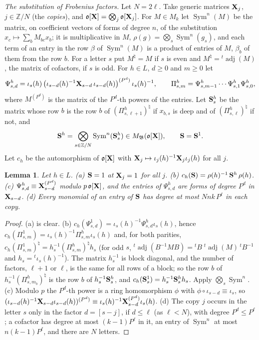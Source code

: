 \documentclass[10pt]{amsart}
\newtheorem{lemma}[theorem]{Lemma}
\theoremstyle{definition}
\theoremstyle{remark}
\newcommand{\Z}{\mathbb Z}
\providecommand{\pao}{\mathfrak o}
\providecommand{\phB}{\mathfrak B}
\begin{document}
\emph{The substitution of Frobenius factors.} Let $N=2\ell$. Take generic matrices $\mathbf X_j$,
$j\in\Z/N$ (the \emph{copies}), and $\pao[\peX]=\bigotimes_j\pao[\peX_j]$. For $M\in M_k$ let
$\operatorname{Sym}^n(M)$ be the matrix, on coefficient vectors of forms of degree $n$, of the
substitution $x_c\mapsto\sum_bM_{bc}x_b$; it is multiplicative in $M$, $\rho(g)=\bigotimes_s
\operatorname{Sym}^n(g_s)$, and each term of an entry in the row $\beta$ of
$\operatorname{Sym}^n(M)$ is a product of entries of $M$, $\beta_b$ of them from the row $b$. For a
letter $s$ put $M^\natural=M$ if $s$ is even and $M^\natural={}^t\!\operatorname{adj}(M)$, the
matrix of cofactors, if $s$ is odd. For $h\in L$, $d\ge0$ and $m\ge0$ let
\[
\Psi^h_{s,d}=\iota_s(h)\,\bigl(\iota_{s-d}(h)^{-1}\mathbf X_{s-d}\,\iota_{s-d}(h)\bigr)^{(P^d)}\,\iota_s
(h)^{-1},\qquad\Pi^h_{s,m}=\Psi^h_{s,m-1}\cdots\Psi^h_{s,1}\Psi^h_{s,0},
\]
where $M^{(P^d)}$ is the matrix of the $P^d$-th powers of the entries. Let $\mathbf S^h_s$ be the matrix
whose row $b$ is the row $b$ of $(\Pi^h_{s,\ell+1})^\natural$ if $x_{b,s}$ is deep and of
$(\Pi^h_{s,\ell})^\natural$ if not, and
\[
\peS^h=\bigotimes_{s\in\Z/N}\operatorname{Sym}^n(\peS^h_s)\in M_\phB(\pao[\peX]),\qquad\peS=\peS^1.
\]
Let $c_h$ be the automorphism of $\pao[\peX]$ with $\mathbf X_j\mapsto\iota_j(h)^{-1}\mathbf X_j\iota_j(h)$
for all $j$.

\begin{lemma}\label{pe:subst}
Let $h\in L$. {\rm(a)} $\mathbf S=1$ at $\mathbf X_j=1$ for all $j$. {\rm(b)} $c_h(\mathbf S)=\rho(h)^{-1}\,
\mathbf S^h\,\rho(h)$. {\rm(c)} $\Psi^h_{s,d}\equiv\mathbf X_{s-d}^{(P^d)}$ modulo $p\,\pao[\peX]$, and the
entries of $\Psi^h_{s,d}$ are forms of degree $P^d$ in $\mathbf X_{s-d}$. {\rm(d)} Every monomial of an
entry of $\mathbf S$ has degree at most $Nnk\,P^\ell$ in each copy.
\end{lemma}
\begin{proof}
(a) is clear. (b) $c_h(\Psi^1_{s,d})=\iota_s(h)^{-1}\Psi^h_{s,d}\iota_s(h)$, hence
$c_h(\Pi^1_{s,m})=\iota_s(h)^{-1}\Pi^h_{s,m}\iota_s(h)$ and, for both parities,
$c_h(\Pi^1_{s,m})^\natural=h_s^{-1}(\Pi^h_{s,m})^\natural h_s$ (for odd $s$,
${}^t\!\operatorname{adj}(B^{-1}MB)={}^tB\;{}^t\!\operatorname{adj}(M)\,{}^tB^{-1}$ and
$h_s={}^t\iota_s(h)^{-1}$). The matrix $h_s^{-1}$ is block diagonal, and the number of factors,
$\ell+1$ or $\ell$, is the same for all rows of a block; so the row $b$ of $h_s^{-1}(\Pi^h_{s,m_b}
)^\natural$ is the row $b$ of $h_s^{-1}\mathbf S^h_s$, and $c_h(\mathbf S^1_s)=h_s^{-1}\mathbf S^h_sh_s$. Apply
$\bigotimes_s\operatorname{Sym}^n$. (c) Modulo $p$ the $P^d$-th power is a ring homomorphism
$\phi$ with $\phi\circ\iota_{s-d}\equiv\iota_s$, so $(\iota_{s-d}(h)^{-1}\mathbf X_{s-d}\iota_{s-d}(h)
)^{(P^d)}\equiv\iota_s(h)^{-1}\mathbf X_{s-d}^{(P^d)}\iota_s(h)$. (d) The copy $j$ occurs in the letter
$s$ only in the factor $d=[s-j]$, if $d\le\ell$ (as $\ell<N$), with degree $P^d\le P^\ell$; a
cofactor has degree at most $(k-1)P^\ell$ in it, an entry of $\operatorname{Sym}^n$ at most
$n(k-1)P^\ell$, and there are $N$ letters.
\end{proof}
\end{document}
